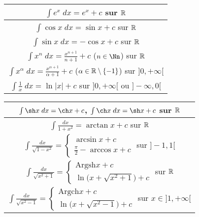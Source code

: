 \documentclass[class=report,crop=false]{standalone}
\begin{document}
\begin{center}
\setlength{\arrayrulewidth}{0.05mm}
\begin{tabular}{|c@{\vrule depth 3ex height 4ex width 0mm \ }|}
\hline
   $\int e^x \; dx  = e^x + c$  \quad sur $\mathbb{R}$ \\ \hline
   $\int \cos x \; dx  = \sin x  + c$  \quad sur $\mathbb{R}$ \\ \hline
   $\int \sin x \; dx  = -\cos x  + c$  \quad sur $\mathbb{R}$ \\ \hline
   $\int x^n \; dx = \frac{x^{n+1}}{n+1} + c$  \quad ($n \in \Nn$)  \quad sur $\mathbb{R}$ \\ \hline
   $\int x^\alpha \; dx = \frac{x^{\alpha+1}}{\alpha+1} + c$  \quad ($\alpha \in \mathbb{R}\setminus\{-1\}$)  sur $]0,+\infty[$\\ \hline
   $\int \frac 1x \; dx  = \ln |x|  + c$  \quad sur $]0,+\infty[$ ou $]-\infty,0[$ \\ \hline
\end{tabular}
\begin{tabular}{|c@{\vrule depth 3ex height 4ex width 0mm \ }|}
\hline
   $\int\sh x \; dx=\ch x+c$, $\int \ch x \; dx=\sh x+c$ \quad sur $\mathbb{R}$ \\ \hline
   $\int \frac{dx}{1+x^2}= \arctan x+c$ \quad sur $\mathbb{R}$ \\ \hline
   $\int\frac{dx}{\sqrt{1-x^2}} = \left\{ \begin{array}{l}
   \arcsin x + c \\ \frac\pi2-\arccos x +c \end{array} \right.$ \quad  sur $]-1,1[$ \\ \hline
   $\int \frac{dx}{\sqrt {x^2+1}}=  \left\{ \begin{array}{l} \mbox{Argsh} x+c \\
   \ln\big(x+\sqrt{x^2+1}\big)+c  \end{array} \right.$ \quad sur $\mathbb{R}$ \\ \hline
   $\int \frac{dx}{\sqrt {x^2-1}} = \left\{ \begin{array}{l} \mbox{Argch} x+c \\
   \ln\big(x+\sqrt{x^2-1}\big)+c \end{array} \right.$ \quad sur $x\in ]1,+ \infty[$\\ \hline
\end{tabular}
\end{center}
\end{document}
